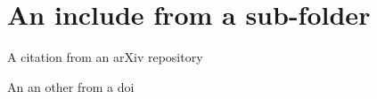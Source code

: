 \section{An include from a sub-folder}

A citation from an arXiv repository \cite{2003.02751}

An an other from a doi \cite{10.1016/j.jcp.2018.10.045}